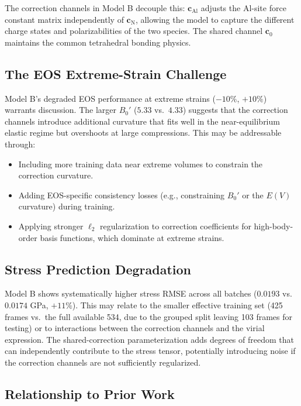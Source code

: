 \documentclass[twoside,prb,aps,floatfix,superscriptaddress,longbibliography]{revtex4-2}
\begin{document}
The correction channels in Model B decouple this: $\mathbf{c}_{\mathrm{Al}}$ adjusts the Al-site force constant matrix independently of $\mathbf{c}_{\mathrm{N}}$, allowing the model to capture the different charge states and polarizabilities of the two species. The shared channel $\mathbf{c}_0$ maintains the common tetrahedral bonding physics.

\subsection{The EOS Extreme-Strain Challenge}

Model B's degraded EOS performance at extreme strains ($-10\%$, $+10\%$) warrants discussion. The larger $B_0'$ ($5.33$ vs.\ $4.33$) suggests that the correction channels introduce additional curvature that fits well in the near-equilibrium elastic regime but overshoots at large compressions. This may be addressable through:
\begin{itemize}
    \item Including more training data near extreme volumes to constrain the correction curvature.
    \item Adding EOS-specific consistency losses (e.g., constraining $B_0'$ or the $E(V)$ curvature) during training.
    \item Applying stronger $\ell_2$ regularization to correction coefficients for high-body-order basis functions, which dominate at extreme strains.
\end{itemize}

\subsection{Stress Prediction Degradation}

Model B shows systematically higher stress RMSE across all batches ($0.0193$ vs.\ $0.0174$ GPa, $+11\%$). This may relate to the smaller effective training set (425 frames vs.\ the full available 534, due to the grouped split leaving 103 frames for testing) or to interactions between the correction channels and the virial expression. The shared-correction parameterization adds degrees of freedom that can independently contribute to the stress tensor, potentially introducing noise if the correction channels are not sufficiently regularized.

\subsection{Relationship to Prior Work}
\end{document}
